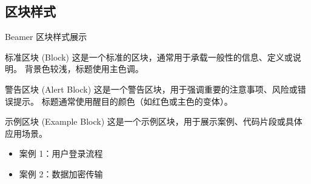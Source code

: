 \subsection{区块样式}
\begin{frame}{Beamer 区块样式展示}
  \begin{block}{标准区块 (Block)}
    这是一个标准的区块，通常用于承载一般性的信息、定义或说明。
    背景色较浅，标题使用主色调。
  \end{block}

  \begin{alertblock}{警告区块 (Alert Block)}
    这是一个警告区块，用于强调重要的注意事项、风险或错误提示。
    标题通常使用醒目的颜色（如红色或主色的变体）。
  \end{alertblock}

  \begin{exampleblock}{示例区块 (Example Block)}
    这是一个示例区块，用于展示案例、代码片段或具体应用场景。
    \begin{itemize}
      \item 案例 1：用户登录流程
      \item 案例 2：数据加密传输
    \end{itemize}
  \end{exampleblock}
\end{frame}

